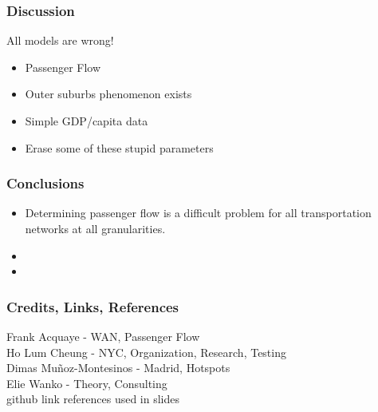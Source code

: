\documentclass{beamer}
\begin{document}
\begin{frame}
\frametitle{Discussion}
All models are wrong!\\
\begin{itemize}
    \item Passenger Flow
    \item Outer suburbs phenomenon exists
    \item Simple GDP/capita data
    \item Erase some of these stupid parameters
\end{itemize}
\end{frame}
\begin{frame}
\frametitle{Conclusions}
\begin{itemize}
    \item Determining passenger flow is a difficult problem for all transportation networks at all granularities.
    \item 
    \item 
\end{itemize}
\end{frame}
\begin{frame}
\frametitle{Credits, Links, References}
Frank Acquaye - WAN, Passenger Flow\\
Ho Lum Cheung - NYC, Organization, Research, Testing\\
Dimas Muñoz-Montesinos - Madrid, Hotspots\\
Elie Wanko - Theory, Consulting\\
github link
references used in slides
{}

\end{frame}
\end{document}
